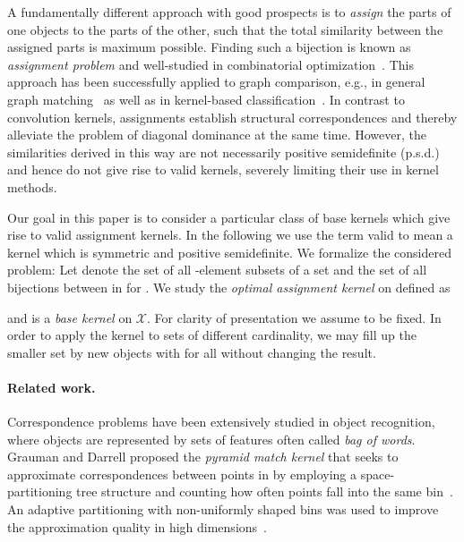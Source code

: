 \documentclass{article}
\newcommand{\X}{\ensuremath{\mathcal{X}}\xspace}
\begin{document}
A fundamentally different approach with good prospects is to \emph{assign}
the parts of one objects to the parts of the other, such that the total 
similarity between the assigned parts is maximum possible. 
Finding such a bijection is known as \emph{assignment problem} and well-studied
in combinatorial optimization~\cite{Burkard2012}.
This approach has been successfully applied to graph comparison, e.g., in general 
graph matching~\cite{Gori2005,Riesen2009a} as well as in kernel-based
classification~\cite{Frohlich2005,Schiavinato2015,Bai2015}.
In contrast to convolution kernels, assignments establish structural 
correspondences and thereby alleviate the problem of diagonal dominance at the 
same time.
However, the similarities derived in this way are not necessarily positive 
semidefinite (p.s.d.)~\cite{Vert2008,Vishwanathan2010} and hence do not give 
rise to valid kernels, severely limiting their use in kernel methods. 

Our goal in this paper is to consider a particular class of base kernels which 
give rise to valid assignment kernels. In the following we use the term valid to 
mean a kernel which is symmetric and positive semidefinite. 
We formalize the considered problem:
Let  denote the set of all -element subsets of a set  and 
 the set of all bijections between  in  for 
. 
We study the \emph{optimal assignment kernel}  on  defined as

and  is a \emph{base kernel} on \X. 
For clarity of presentation we assume  to be fixed. In order to apply the 
kernel to sets of different cardinality, we may fill up the smaller set by new 
objects  with  for all  without changing the result.


\paragraph{Related work.}
Correspondence problems have been extensively studied in object recognition, 
where objects are represented by sets of features often called \emph{bag of words}.
Grauman and Darrell proposed the \emph{pyramid match kernel} that seeks to
approximate correspondences between points in  by employing a 
space-partitioning tree structure and counting how often points fall into the 
same bin~\cite{Grauman2007}. An adaptive partitioning with non-uniformly shaped 
bins was used to improve the approximation quality in high dimensions~\cite{Grauman2007a}.
\end{document}
